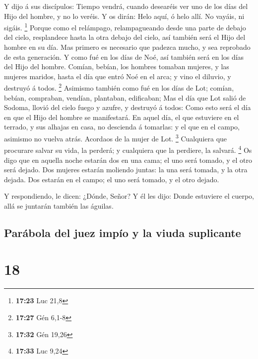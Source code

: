  Y dijo á sus discípulos: Tiempo vendrá, cuando desearéis
ver uno de los días del Hijo del hombre, y no lo veréis.  Y
os dirán: Helo aquí, ó helo allí. No vayáis, ni sigáis. \footnote{\textbf{17:23}
  Luc 21,8}  Porque como el relámpago, relampagueando desde
una parte de debajo del cielo, resplandece hasta la otra debajo del
cielo, así también será el Hijo del hombre en su día.  Mas
primero es necesario que padezca mucho, y sea reprobado de esta
generación.  Y como fué en los días de Noé, así también
será en los días del Hijo del hombre.  Comían, bebían, los
hombres tomaban mujeres, y las mujeres maridos, hasta el día que entró
Noé en el arca; y vino el diluvio, y destruyó á todos. \footnote{\textbf{17:27}
  Gén 6,1-8}  Asimismo también como fué en los días de Lot;
comían, bebían, compraban, vendían, plantaban, edificaban; 
Mas el día que Lot salió de Sodoma, llovió del cielo fuego y azufre, y
destruyó á todos:  Como esto será el día en que el Hijo del
hombre se manifestará.  En aquel día, el que estuviere en
el terrado, y sus alhajas en casa, no descienda á tomarlas: y el que en
el campo, asimismo no vuelva atrás.  Acordaos de la mujer
de Lot. \footnote{\textbf{17:32} Gén 19,26}  Cualquiera que
procurare salvar su vida, la perderá; y cualquiera que la perdiere, la
salvará. \footnote{\textbf{17:33} Luc 9,24}  Os digo que en
aquella noche estarán dos en una cama; el uno será tomado, y el otro
será dejado.  Dos mujeres estarán moliendo juntas: la una
será tomada, y la otra dejada.  Dos estarán en el campo; el
uno será tomado, y el otro dejado.

 Y respondiendo, le dicen: ¿Dónde, Señor? Y él les dijo:
Donde estuviere el cuerpo, allá se juntarán también las águilas.

\hypertarget{paruxe1bola-del-juez-impuxedo-y-la-viuda-suplicante}{%
\subsection{Parábola del juez impío y la viuda
suplicante}\label{paruxe1bola-del-juez-impuxedo-y-la-viuda-suplicante}}

\hypertarget{section-17}{%
\section{18}\label{section-17}}

